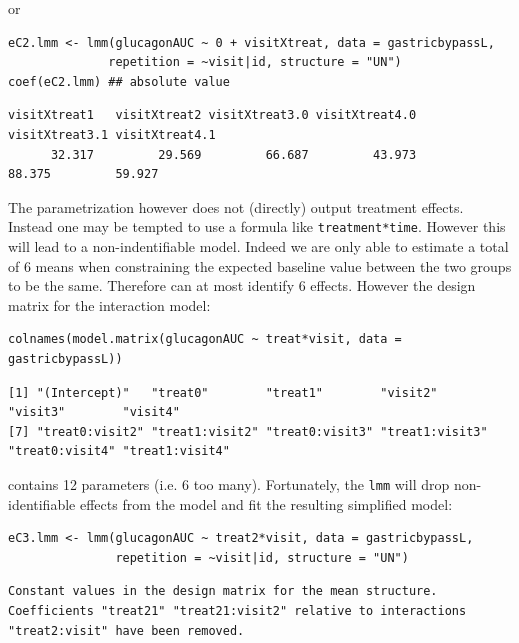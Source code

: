\documentclass[12pt]{article}
\begin{document}
or
\lstset{language=r,label= ,caption= ,captionpos=b,numbers=none}
\begin{lstlisting}
eC2.lmm <- lmm(glucagonAUC ~ 0 + visitXtreat, data = gastricbypassL,
              repetition = ~visit|id, structure = "UN")
coef(eC2.lmm) ## absolute value
\end{lstlisting}

\begin{verbatim}
visitXtreat1   visitXtreat2 visitXtreat3.0 visitXtreat4.0 visitXtreat3.1 visitXtreat4.1 
      32.317         29.569         66.687         43.973         88.375         59.927
\end{verbatim}


The parametrization however does not (directly) output treatment
effects. Instead one may be tempted to use a formula like
\texttt{treatment*time}. However this will lead to a non-indentifiable
model. Indeed we are only able to estimate a total of 6 means when
constraining the expected baseline value between the two groups to be
the same. Therefore can at most identify 6 effects. However the design
matrix for the interaction model:
\lstset{language=r,label= ,caption= ,captionpos=b,numbers=none}
\begin{lstlisting}
colnames(model.matrix(glucagonAUC ~ treat*visit, data = gastricbypassL))
\end{lstlisting}

\begin{verbatim}
[1] "(Intercept)"   "treat0"        "treat1"        "visit2"        "visit3"        "visit4"       
[7] "treat0:visit2" "treat1:visit2" "treat0:visit3" "treat1:visit3" "treat0:visit4" "treat1:visit4"
\end{verbatim}


contains 12 parameters (i.e. 6 too many). Fortunately, the \texttt{lmm} will
 drop non-identifiable effects from the model and fit the resulting
 simplified model:
\lstset{language=r,label= ,caption= ,captionpos=b,numbers=none}
\begin{lstlisting}
eC3.lmm <- lmm(glucagonAUC ~ treat2*visit, data = gastricbypassL,
               repetition = ~visit|id, structure = "UN")
\end{lstlisting}

\begin{verbatim}
Constant values in the design matrix for the mean structure.
Coefficients "treat21" "treat21:visit2" relative to interactions "treat2:visit" have been removed.
\end{verbatim}
\end{document}
